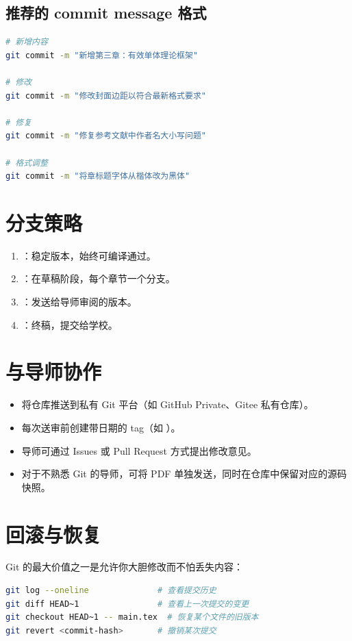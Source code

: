 \documentclass[../main-manual.tex]{subfiles}
\begin{document}
\subsection{推荐的 commit message 格式}

\begin{lstlisting}[language=bash, caption={提交信息示例}]
# 新增内容
git commit -m "新增第三章：有效单体理论框架"

# 修改
git commit -m "修改封面边距以符合最新格式要求"

# 修复
git commit -m "修复参考文献中作者名大小写问题"

# 格式调整
git commit -m "将章标题字体从楷体改为黑体"
\end{lstlisting}

\section{分支策略}

\begin{enumerate}[label=\textbf{分支\arabic*：}]
	\item \textbf{}：稳定版本，始终可编译通过。
	\item \textbf{}：在草稿阶段，每个章节一个分支。
	\item \textbf{}：发送给导师审阅的版本。
	\item \textbf{}：终稿，提交给学校。
\end{enumerate}

\section{与导师协作}

\begin{itemize}
	\item 将仓库推送到私有 Git 平台（如 GitHub Private、Gitee 私有仓库）。
	\item 每次送审前创建带日期的 tag（如 ）。
	\item 导师可通过 Issues 或 Pull Request 方式提出修改意见。
	\item 对于不熟悉 Git 的导师，可将 PDF 单独发送，同时在仓库中保留对应的源码快照。
\end{itemize}

\section{回滚与恢复}

Git 的最大价值之一是允许你大胆修改而不怕丢失内容：

\begin{lstlisting}[language=bash, caption={常用回滚操作}]
git log --oneline              # 查看提交历史
git diff HEAD~1                # 查看上一次提交的变更
git checkout HEAD~1 -- main.tex  # 恢复某个文件的旧版本
git revert <commit-hash>       # 撤销某次提交
\end{lstlisting}
\end{document}
